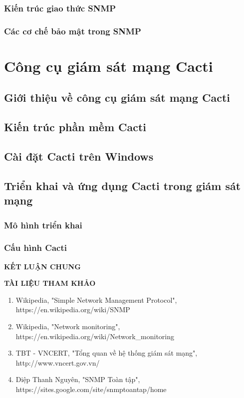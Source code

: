 \documentclass[12pt,oneside,a4paper,reqno]{report}
\begin{document}
\begin{large}
\subsection{Kiến trúc giao thức SNMP}
\subsection{Các cơ chế bảo mật trong SNMP}


\chapter{Công cụ giám sát mạng Cacti}
\section{Giới thiệu về công cụ giám sát mạng Cacti}
\section{Kiến trúc phần mềm Cacti}
\section{Cài đặt Cacti trên Windows}
\section{Triển khai và ứng dụng Cacti trong giám sát mạng}
\subsection{Mô hình triển khai}
\subsection{Cấu hình Cacti}

\newpage
\vspace*{0.2cm}
\centerline{\Large\bf KẾT LUẬN CHUNG}
\vspace*{0.5cm}

\newpage
\vspace*{0.2cm}
\centerline{\Large\bf TÀI LIỆU THAM KHẢO}
\vspace*{0.5cm}

%
\begin{enumerate}
\item{Wikipedia, "Simple Network Management Protocol", https://en.wikipedia.org/wiki/SNMP}
\item{Wikipedia, "Network monitoring", https://en.wikipedia.org/wiki/Network\_monitoring}
\item{TBT - VNCERT, "Tổng quan về hệ thống giám sát mạng", http://www.vncert.gov.vn/}
\item{Diệp Thanh Nguyên, "SNMP Toàn tập", https://sites.google.com/site/snmptoantap/home}
\end{enumerate}
	
\end{large}		
\end{document}
